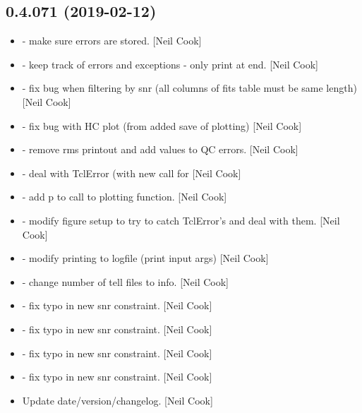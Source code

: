 \documentclass[a4paper,10pt,english]{report}
\begin{document}
\subsection{0.4.071 (2019-02-12)}
\label{\detokenize{misc/changelog:id187}}\begin{itemize}
\item {} 
 - make sure  errors are stored. {[}Neil
Cook{]}

\item {} 
 - keep track of errors and exceptions - only print
at end. {[}Neil Cook{]}

\item {} 
 - fix bug when filtering by snr (all columns of
fits table must be same length) {[}Neil Cook{]}

\item {} 
 - fix bug with HC plot (from added save of plotting)
{[}Neil Cook{]}

\item {} 
 - remove rms printout and add values to QC
errors. {[}Neil Cook{]}

\item {} 
 - deal with TclError (with new call for 
{[}Neil Cook{]}

\item {} 
 - add p to call to plotting function. {[}Neil
Cook{]}

\item {} 
 - modify figure setup to try to catch TclError’s and
deal with them. {[}Neil Cook{]}

\item {} 
 - modify printing to logfile (print input args)
{[}Neil Cook{]}

\item {} 
 - change number of tell files to info. {[}Neil
Cook{]}

\item {} 
 - fix typo in new snr constraint. {[}Neil Cook{]}

\item {} 
 - fix typo in new snr constraint. {[}Neil Cook{]}

\item {} 
 - fix typo in new snr constraint. {[}Neil Cook{]}

\item {} 
 - fix typo in new snr constraint. {[}Neil Cook{]}

\item {} 
Update date/version/changelog. {[}Neil Cook{]}

\end{itemize}
\end{document}
